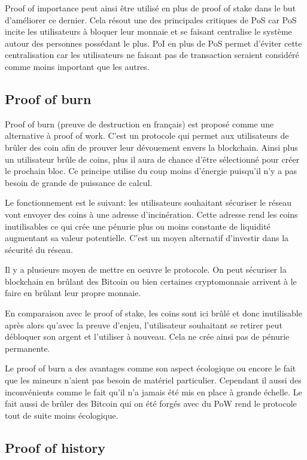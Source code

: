 Proof of importance peut ainsi être utilisé en plus de proof of stake dans le but d'améliorer ce dernier. Cela résout une des principales critiques de PoS car PoS incite les utilisateurs à bloquer leur monnaie et se faisant centralise le système autour des personnes possédant le plus. PoI en plus de PoS permet d'éviter cette centralisation car les utilisateurs ne faisant pas de transaction seraient considéré comme moins important que les autres.

\subsection{Proof of burn}

Proof of burn (preuve de destruction en français) est proposé comme une alternative à proof of work. C'est un protocole qui permet aux utilisateurs de brûler des coin afin de prouver leur dévouement envers la blockchain. Ainsi plus un utilisateur brûle de coins, plus il aura de chance d'être sélectionné pour créer le prochain bloc. Ce principe utilise du coup moins d'énergie puisqu'il n'y a pas besoin de grande de puissance de calcul.

Le fonctionnement est le suivant: les utilisateurs souhaitant sécuriser le réseau vont envoyer des coins à une adresse d'incinération. Cette adresse rend les coins inutilisables ce qui crée une pénurie plus ou moins constante de liquidité augmentant sa valeur potentielle. C'est un moyen alternatif d'investir dans la sécurité du réseau.

Il y a plusieurs moyen de mettre en oeuvre le protocole. On peut sécuriser la blockchain en brûlant des Bitcoin ou bien certaines cryptomonnaie arrivent à le faire en brûlant leur propre monnaie.

En comparaison avec le proof of stake, les coins sont ici brûlé et donc inutilisable après alors qu'avec la preuve d'enjeu, l'utilisateur souhaitant se retirer peut débloquer son argent et l'utiliser à nouveau. Cela ne crée ainsi pas de pénurie permanente.

Le proof of burn a des avantages comme son aspect écologique ou encore le fait que les mineurs n'aient pas besoin de matériel particulier. Cependant il aussi des inconvénients comme le fait qu'il n'a jamais été mis en place à grande échelle. Le fait aussi de brûler des Bitcoin qui on été forgés avec du PoW rend le protocole tout de suite moins écologique.

\subsection{Proof of history}

